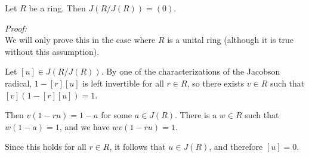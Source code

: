 \documentclass[12pt]{article}
\begin{document}

Let $R$ be a ring.  Then $J(R/J(R))=(0)$.

{\it Proof:}\\
We will only prove this in the case where $R$ is a unital ring
(although it is true without this assumption).

Let $[u] \in J(R/J(R))$.
By one of the characterizations of the Jacobson radical,
$1-[r][u]$ is left invertible for all $r \in R$,
so there exists $v \in R$ such that $[v](1-[r][u])=1$.

Then $v(1-ru)=1-a$ for some $a \in J(R)$.
There is a $w \in R$ such that $w(1-a)=1$,
and we have $wv(1-ru)=1$.

Since this holds for all $r \in R$,
it follows that $u \in J(R)$, and therefore $[u]=0$.
\end{document}
